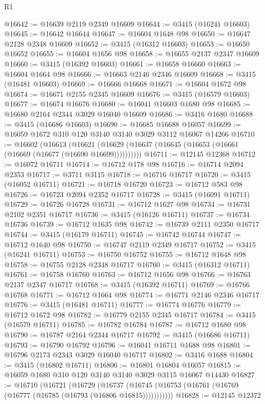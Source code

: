 \begin{lexlean}{R1}
\begin{coremodule}
@16642 := @16639 @2119 @2349 @16609
@16644 := @3415 (@16241 @16603)
@16645 := @16642 @16644
@16647 := @16604 @1648 @98
@16650 := @16647 @2128 @2348 @16609
@16652 := @3415 (@16312 @16603)
@16653 := @16650 @16652
@16655 := @16604 @1656 @98
@16658 := @16655 @2137 @2347 @16609
@16660 := @3415 (@16392 @16603)
@16661 := @16658 @16660
@16663 := @16604 @1664 @98
@16666 := @16663 @2146 @2346 @16609
@16668 := @3415 (@16481 @16603)
@16669 := @16666 @16668
@16671 := @16604 @1672 @98
@16674 := @16671 @2155 @2345 @16609
@16676 := @3415 (@16579 @16603)
@16677 := @16674 @16676
@16680 := @16041 @16603 @1680 @98
@16685 := @16680 @2164 @2344 @3029 @16040 @16609
@16686 := @3416 @1680
@16688 := @3415 (@16686 @16603)
@16690 := @16685 @16688 @16057
@16699 := @16059 @1672 @310 @120 @3140 @3140 @3029 @3112 @16067 @14266
@16710 := @16602
    (@16613 (@16621 (@16629 (@16637 (@16645 (@16653 (@16661 (@16669 (@16677 (@16690 @16699))))))))))
@16711 := @12145 @12368
@16712 := @16072 @16711
@16714 := @16712 @178 @98
@16716 := @16714 @2094 @2353
@16717 := @3711 @3115
@16718 := @16716 @16717
@16720 := @3415 (@16052 @16711)
@16721 := @16718 @16720
@16723 := @16712 @583 @98
@16726 := @16723 @2094 @2352 @16717
@16728 := @3415 (@16091 @16711)
@16729 := @16726 @16728
@16731 := @16712 @1627 @98
@16734 := @16731 @2102 @2351 @16717
@16736 := @3415 (@16126 @16711)
@16737 := @16734 @16736
@16739 := @16712 @1635 @98
@16742 := @16739 @2111 @2350 @16717
@16744 := @3415 (@16179 @16711)
@16745 := @16742 @16744
@16747 := @16712 @1640 @98
@16750 := @16747 @2119 @2349 @16717
@16752 := @3415 (@16241 @16711)
@16753 := @16750 @16752
@16755 := @16712 @1648 @98
@16758 := @16755 @2128 @2348 @16717
@16760 := @3415 (@16312 @16711)
@16761 := @16758 @16760
@16763 := @16712 @1656 @98
@16766 := @16763 @2137 @2347 @16717
@16768 := @3415 (@16392 @16711)
@16769 := @16766 @16768
@16771 := @16712 @1664 @98
@16774 := @16771 @2146 @2346 @16717
@16776 := @3415 (@16481 @16711)
@16777 := @16774 @16776
@16779 := @16712 @1672 @98
@16782 := @16779 @2155 @2345 @16717
@16784 := @3415 (@16579 @16711)
@16785 := @16782 @16784
@16787 := @16712 @1680 @98
@16790 := @16787 @2164 @2344 @16717
@16792 := @3415 (@16686 @16711)
@16793 := @16790 @16792
@16796 := @16041 @16711 @1688 @98
@16801 := @16796 @2173 @2343 @3029 @16040 @16717
@16802 := @3416 @1688
@16804 := @3415 (@16802 @16711)
@16806 := @16801 @16804 @16057
@16815 := @16059 @1680 @310 @120 @3140 @3140 @3029 @3115 @16067 @14430
@16827 := @16710
    (@16721
      (@16729
        (@16737 (@16745 (@16753 (@16761 (@16769 (@16777 (@16785 (@16793 (@16806 @16815)))))))))))
@16828 := @12145 @12372

\end{coremodule}
\end{lexlean}
